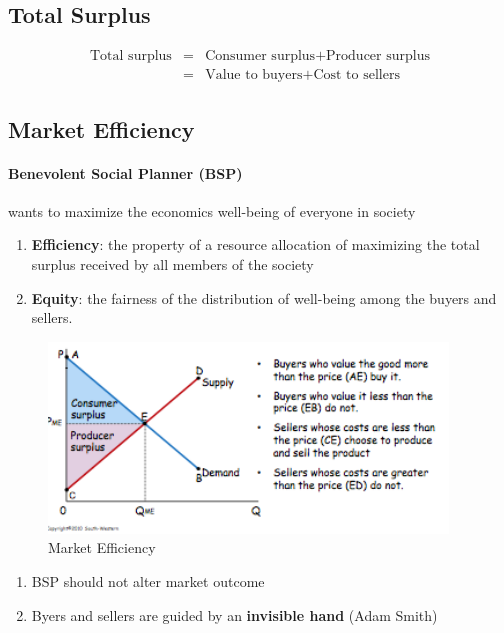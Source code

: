 \documentclass[a4paper,titlepage] {scrartcl}
\begin{document}
\subsection{Total Surplus}
\begin{eqnarray*}
	\text{Total surplus} &=&  \text{Consumer surplus} + \text{Producer surplus}\nonumber\\
	&=& \text{Value to buyers} + \text{Cost to sellers}
\end{eqnarray*}

\subsection{Market Efficiency}
\paragraph{Benevolent Social Planner (BSP)} %
\label{par:benevolent_social_planner_bsp_}
wants to maximize the economics well-being of everyone in society

\begin{enumerate}
	\item \textbf{Efficiency}: the property of a resource allocation of maximizing the total surplus received by all members of the society
	\item \textbf{Equity}: the fairness of the distribution of well-being among the buyers and sellers.
	
	
\end{enumerate}
\begin{figure}[htbp]
	\centering
		\includegraphics[height=2in]{images/mrktEff.png}
	\caption{Market Efficiency}
	\label{fig:images_mrktEff}
\end{figure}

\begin{enumerate}
	\item BSP should not alter market outcome
	\item Byers and sellers are guided by an \textbf{invisible hand} (Adam Smith)
\end{enumerate}
\end{document}
